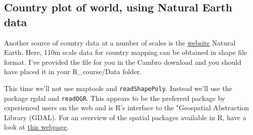 \documentclass[titlepage]{book}\usepackage{knitr}
\begin{document}
\subsection{Country plot of world, using Natural Earth data}
Another source of country data at a number of scales is the \href{http://www.naturalearthdata.com/}{website} Natural Earth.  Here, 110m scale data for country mapping can be obtained in shape file format.  I've provided the file for you in the Cambro download and you should have placed it in your R\_course/Data folder. 

This time we'll not use maptools and \texttt{readShapePoly}. Instead we'll use the package rgdal and \texttt{readOGR}. This appears to be the preferred package by experienced users on the web and is R's interface to the "Geospatial Abstraction Library (GDAL). For an overview of  the spatial packages available in R, have a look at \href{http://cran.r-project.org/web/views/Spatial.html}{this webpage}.
\end{document}
